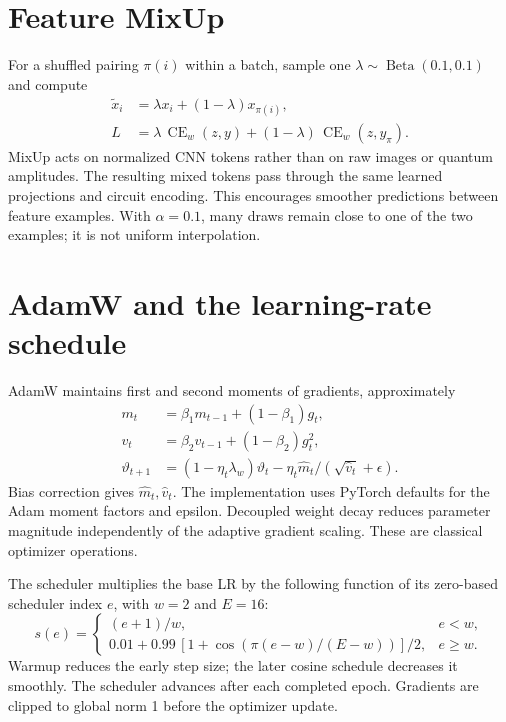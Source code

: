 \documentclass[11pt,a4paper]{report}
\begin{document}
\section{Feature MixUp}
For a shuffled pairing $\pi(i)$ within a batch, sample one $\lambda\sim\operatorname{Beta}(0.1,0.1)$ and compute
\begin{align}
\widetilde x_i&=\lambda x_i+(1-\lambda)x_{\pi(i)},\\
L&=\lambda\,\operatorname{CE}_w(z,y)+(1-\lambda)\,\operatorname{CE}_w(z,y_\pi).
\end{align}
MixUp acts on normalized CNN tokens rather than on raw images or quantum amplitudes. The resulting mixed tokens pass through the same learned projections and circuit encoding. This encourages smoother predictions between feature examples. With $\alpha=0.1$, many draws remain close to one of the two examples; it is not uniform interpolation.

\section{AdamW and the learning-rate schedule}
AdamW maintains first and second moments of gradients, approximately
\begin{align}
m_t&=\beta_1m_{t-1}+(1-\beta_1)g_t,\\
v_t&=\beta_2v_{t-1}+(1-\beta_2)g_t^2,\\
\vartheta_{t+1}&=(1-\eta_t\lambda_w)\vartheta_t-
\eta_t\widehat m_t/(\sqrt{\widehat v_t}+\epsilon).
\end{align}
Bias correction gives $\widehat m_t,\widehat v_t$. The implementation uses PyTorch defaults for the Adam moment factors and epsilon. Decoupled weight decay reduces parameter magnitude independently of the adaptive gradient scaling. These are classical optimizer operations.

The scheduler multiplies the base LR by the following function of its zero-based scheduler index $e$, with $w=2$ and $E=16$:
\begin{equation}
s(e)=\begin{cases}
(e+1)/w,&e<w,\\
0.01+0.99\,[1+\cos(\pi(e-w)/(E-w))]/2,&e\ge w.
\end{cases}
\end{equation}
Warmup reduces the early step size; the later cosine schedule decreases it smoothly. The scheduler advances after each completed epoch. Gradients are clipped to global norm 1 before the optimizer update.
\end{document}
